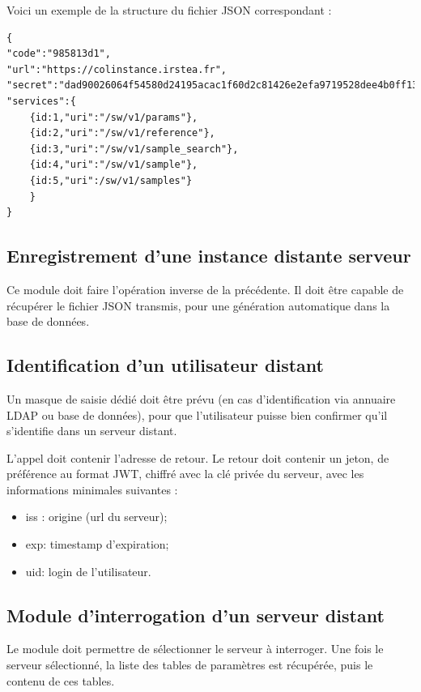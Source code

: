 \pagebreak
Voici un exemple de la structure du fichier JSON correspondant :
\begin{lstlisting}
{
"code":"985813d1",
"url":"https://colinstance.irstea.fr",
"secret":"dad90026064f54580d24195acac1f60d2c81426e2efa9719528dee4b0ff13668",
"services":{
	{id:1,"uri":"/sw/v1/params"},
	{id:2,"uri":"/sw/v1/reference"},
	{id:3,"uri":"/sw/v1/sample_search"},
	{id:4,"uri":"/sw/v1/sample"},
	{id:5,"uri":/sw/v1/samples"}
	}
}
\end{lstlisting}

\subsection{Enregistrement d'une instance distante serveur}
Ce module doit faire l'opération inverse de la précédente. Il doit être capable de récupérer le fichier JSON transmis, pour une génération automatique dans la base de données.

\subsection{Identification d'un utilisateur distant}

Un masque de saisie dédié doit être prévu (en cas d'identification via annuaire LDAP ou base de données), pour que l'utilisateur puisse bien confirmer qu'il s'identifie dans un serveur distant.

L'appel doit contenir l'adresse de retour. Le retour doit contenir un jeton, de préférence au format JWT, chiffré avec la clé privée du serveur, avec les informations minimales suivantes :
\begin{itemize}
\item iss : origine (url du serveur);
\item exp: timestamp d'expiration;
\item uid: login de l'utilisateur.
\end{itemize}

\subsection{Module d'interrogation d'un serveur distant}
Le module doit permettre de sélectionner le serveur à interroger. Une fois le serveur sélectionné, la liste des tables de paramètres est récupérée, puis le contenu de ces tables.


